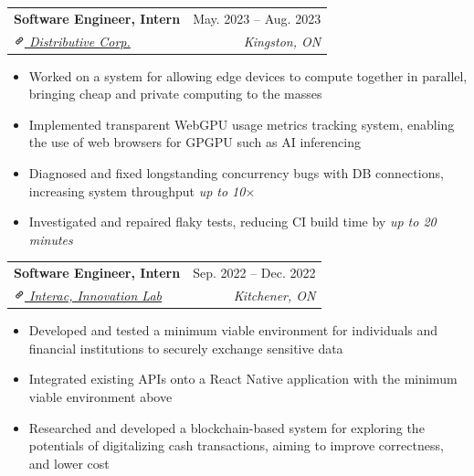 \documentclass[letterpaper, 10pt]{report}
\makeatletter
\newcommand{\resumeSubheading}[4]{
    \begin{tabular*}{\textwidth}[t]{l@{\extracolsep{\fill}}r}
        \textbf{#1}       & #2                \\
        \textit{\small#3} & \textit{\small#4} \\
    \end{tabular*}\vspace{-0.7em}
}
\newenvironment{ResumeItem}{
    \vspace{-0.3em}
    \begin{itemize}
        \setlength\itemsep{-0.3em}
        }{
    \end{itemize}\vspace{-0.3em}}
\newcommand{\linkIcon}{\includegraphics[height=9pt, trim=0 5cm 0 -1.5cm]{./img/link-icon}}
\makeatother
\begin{document}

\resumeSubheading
{Software Engineer, Intern}{May. 2023 -- Aug. 2023}
{\href{https://distributive.network/}{\linkIcon{} Distributive Corp.}}{Kingston, ON}
\begin{ResumeItem}
    \item{Worked on a system for allowing edge devices to compute together in parallel, bringing cheap and private computing to the masses}
    \item{Implemented transparent WebGPU usage metrics tracking system, enabling the use of web browsers for GPGPU such as AI inferencing}
    \item{Diagnosed and fixed longstanding concurrency bugs with DB connections, increasing system throughput \emph{up to 10\(\times\)}}
    \item{Investigated and repaired flaky tests, reducing CI build time by \emph{up to 20 minutes}}
\end{ResumeItem}

\resumeSubheading
{Software Engineer, Intern}{Sep. 2022 -- Dec. 2022}
{\href{https://www.interac.ca/en/}{\linkIcon{} Interac, Innovation Lab}}{Kitchener, ON}
\begin{ResumeItem}
    \item{Developed and tested a minimum viable environment for individuals and financial institutions to securely exchange sensitive data}
    \item{Integrated existing APIs onto a React Native application with the minimum viable environment above}
    \item{Researched and developed a blockchain-based system for exploring the potentials of digitalizing cash transactions, aiming to improve correctness, and lower cost}
\end{ResumeItem}
\end{document}

